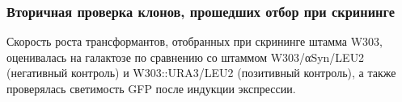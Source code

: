 \subsubsection{Вторичная проверка клонов, прошедших отбор при скрининге}
\label{subsec:second_check}

Скорость роста трансформантов, отобранных при скрининге штамма W303, оценивалась на галактозе по сравнению со штаммом W303/αSyn/LEU2 (негативный контроль) и W303::URA3/LEU2 (позитивный контроль), а также проверялась светимость GFP после индукции экспрессии. 






